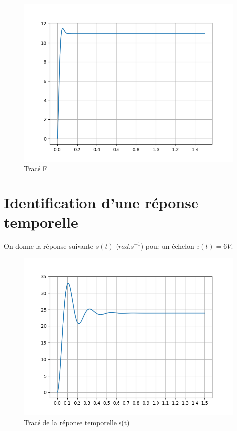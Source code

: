 \begin{figure}[ht!]
\begin{minipage}{0.47\linewidth}
\centering\includegraphics[width=0.95\linewidth]{img/fig13f}
 \caption{Tracé F}
 \label{img13f}
\end{minipage}
\end{figure}



\section{Identification d'une réponse temporelle}

On donne la réponse suivante $s(t)$ ($rad.s^{-1}$) pour un échelon $e(t)=6V$.

\begin{figure}[!ht]
\centering\includegraphics[width=0.8\linewidth]{img/fig14}
\caption{Tracé de la réponse temporelle s(t)}
\label{fig01}
\end{figure}

